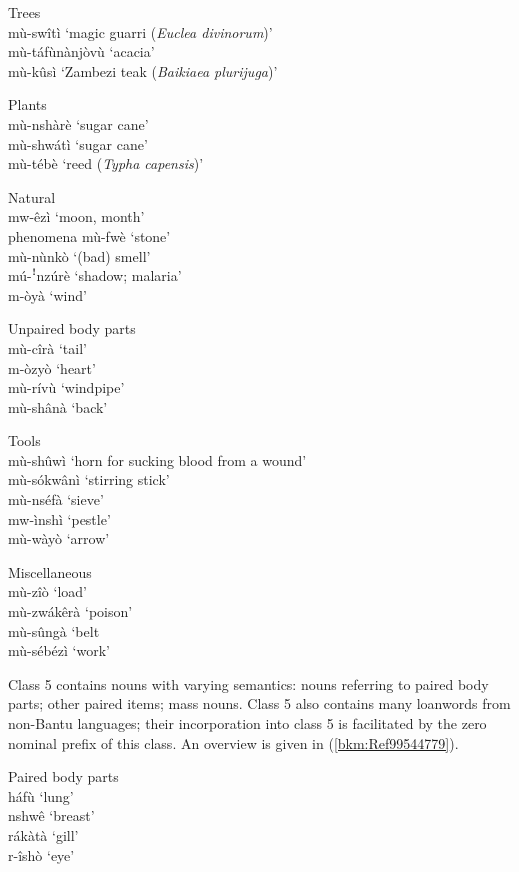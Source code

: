 \ea
  Trees      \\
  mù-swîtì    ‘magic guarri (\textit{Euclea divinorum})’\\
      mù-táfùnànjòvù  ‘acacia’\\
      mù-kûsì    ‘Zambezi teak (\textit{Baikiaea plurijuga})’

\ex
  Plants  \\
  mù-nshàrè    ‘sugar cane’\\
      mù-shwátì    ‘sugar cane’\\
      mù-tébè    ‘reed (\textit{Typha capensis})’

\ex
  Natural  \\
  mw-êzì    ‘moon, month’\\
phenomena    mù-fwè    ‘stone’\\
      mù-nùnkò    ‘(bad) smell’\\
      mú-ꜝnzúrè    ‘shadow; malaria’\\
      m-òyà      ‘wind’

\ex
  Unpaired body parts   \\
  mù-cîrà    ‘tail’\\
    m-òzyò    ‘heart’\\
      mù-rívù    ‘windpipe’\\
      mù-shânà    ‘back’

\ex
  Tools \\
  mù-shûwì    ‘horn for sucking blood from a               wound’ \\
      mù-sókwânì    ‘stirring stick’\\
      mù-nséfà    ‘sieve’\\
      mw-ìnshì    ‘pestle’\\
      mù-wàyò    ‘arrow’

\ex
  Miscellaneous \\
  mù-zîò    ‘load’\\
      mù-zwákêrà    ‘poison’\\
      mù-sûngà    ‘belt\\
      mù-sébézì    ‘work’
\z\z

Class 5 contains nouns with varying semantics: nouns referring to paired body parts; other paired items; mass nouns. Class 5 also contains many loanwords from non-Bantu languages; their incorporation into class 5 is facilitated by the zero nominal prefix of this class. An overview is given in (\ref{bkm:Ref99544779}).

\ea
\label{bkm:Ref99544779}
\ea
 Paired body parts \\
 háfù    ‘lung’\\
      nshwê    ‘breast’\\
      rákàtà    ‘gill’\\
      r-îshò    ‘eye’

